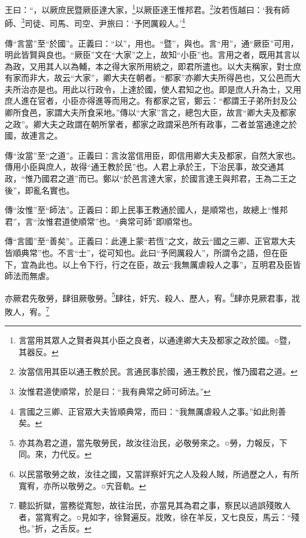 王曰：“，以厥庶民暨厥臣達大家，\footnote{言當用其眾人之賢者與其小臣之良者，以通達卿大夫及都家之政於國。○暨，其器反。}以厥臣達王惟邦君。\footnote{汝當信用其臣以通王教於民。言通民事於國，通王教於民，惟乃國君之道。}汝若恆越曰：‘我有師師、\footnote{汝惟君道使順常，於是曰：“我有典常之師可師法。”}司徒、司馬、司空、尹旅曰：‘予罔厲殺人。’\footnote{言國之三卿、正官眾大夫皆順典常，而曰：“我無厲虐殺人之事。”如此則善矣。}


{\noindent\zhuan{}\fzbyks 傳“言當”至“於國”。正義曰：“以”，用也。“暨”，與也。言“用”，通“厥臣”可用，明此皆賢與良也。“厥臣”文在“大家”之上，故知“小臣”也。言用之者，既用其言以為政，又用其人以為輔，本之得大家所用統之，即君所遣也。以大夫稱家，對士庶有家而非大，故云“大家”，卿大夫在朝者。“都家”亦卿大夫所得邑也，又公邑而大夫所治亦是也。用此以行政令，上達於國，使人君知之也。即是庶人升為士，又用庶人進在官者，小臣亦得進等而用之。有都家之官，鄭云：“都謂王子弟所封及公卿所食邑，家謂大夫所食采地。”傳以“大家”言之，總包大臣，故言“卿大夫及都家之政”。卿大夫之政謂在朝所掌者，都家之政謂采邑所有政事，二者並當通達之於國，故連言之。 \par}

{\noindent\zhuan{}\fzbyks 傳“汝當”至“之道”。正義曰：言汝當信用臣，即信用卿大夫及都家，自然大家也。傳用小臣與庶人，故得“通王教於民”也。人君上承於王，下治民事，故交通其政，“惟乃國君之道”而已。鄭以“於邑言達大家，於國言達王與邦君，王為二王之後”，即亂名實也。 \par}

{\noindent\zhuan{}\fzbyks 傳“汝惟”至“師法”。正義曰：即上民事王教通於國人，是順常也，故總上“惟邦君”，言“汝惟君道使順常”也。“典常可師”即順常也。 \par}

{\noindent\zhuan{}\fzbyks 傳“言國”至“善矣”。正義曰：此連上蒙“若恆”之文，故云“國之三卿、正官眾大夫皆順典常”也。不言“士”，從可知也。此曰“予罔厲殺人”，所謂令之語，但在臣下，宜為此也。以上令下行，行之在臣，故云“我無厲虐殺人之事”，互明君及臣皆師法而無虐。 \par}

亦厥君先敬勞，肆徂厥敬勞。\footnote{亦其為君之道，當先敬勞民，故汝往治民，必敬勞來之。○勞，力報反，下同。來，力代反。}肆往，奸宄、殺人、歷人，宥。\footnote{以民當敬勞之故，汝往之國，又當詳察奸宄之人及殺人賊，所過歷之人，有所寬宥，亦所以敬勞之。○宄音軌。}肆亦見厥君事，戕敗人，宥。\footnote{聽訟折獄，當務從寬恕，故往治民，亦當見其為君之事，察民以過誤殘敗人者，當寬宥之。○見如字，徐賢遍反。戕敗，徐在羊反，又七良反，馬云：“殘也。”折，之舌反。}

